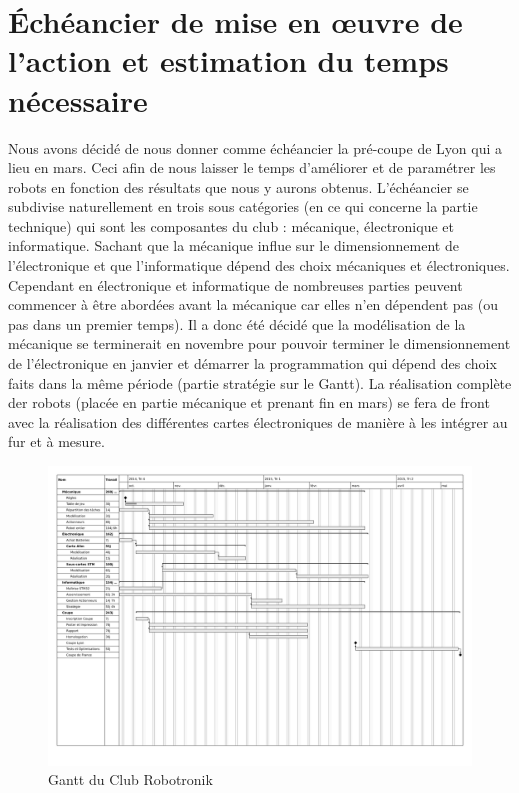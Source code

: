 \documentclass[12pt,a4paper]{article}
\begin{document}
\part{Échéancier de mise en œuvre de l'action et estimation du temps nécessaire}
Nous avons décidé de nous donner comme échéancier la pré-coupe de Lyon qui a lieu en mars. Ceci afin de nous laisser le temps d'améliorer et de paramétrer les robots en fonction des résultats que nous y aurons obtenus.
L'échéancier se subdivise naturellement en trois sous catégories (en ce qui concerne la partie technique) qui sont les composantes du club : mécanique, électronique et informatique. Sachant que la mécanique influe sur le dimensionnement de l'électronique  et que l'informatique dépend des choix mécaniques et électroniques. Cependant en électronique et informatique de nombreuses parties peuvent commencer à être abordées avant la mécanique car elles n'en dépendent pas (ou pas dans un premier temps). Il a donc été décidé que la modélisation de la mécanique se terminerait en novembre pour pouvoir terminer le dimensionnement de l'électronique en janvier et démarrer la programmation qui dépend des choix faits dans la même période (partie stratégie sur le Gantt). La réalisation complète der robots (placée en partie mécanique et prenant fin en mars) se fera de front avec la réalisation des différentes cartes électroniques de manière à les intégrer au fur et à mesure.
\begin{figure}[hh]
    \begin{center}
        \includegraphics[trim=27px 215px 17px 33px,clip=true , width=\textwidth]{Public/GanttRobo.pdf}
        \caption{Gantt du Club Robotronik}
    \end{center}
\end{figure}
\end{document}
